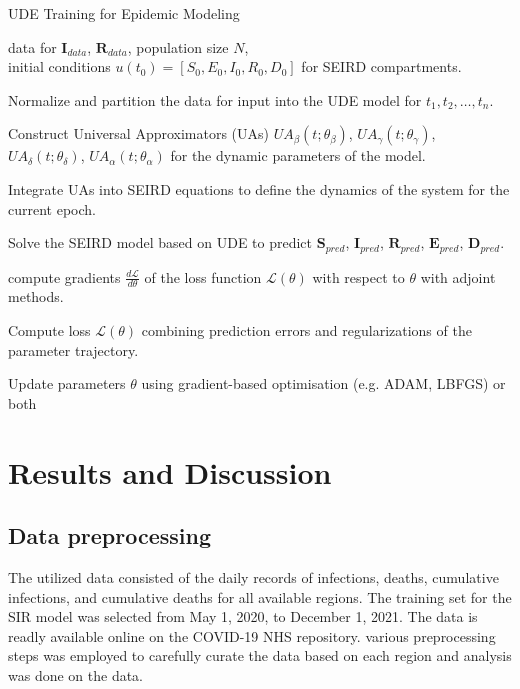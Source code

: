 \documentclass[12pt]{article}
\begin{document}
\begin{algorithm}[h]
    \label{algo:2}
    \caption{UDE Training for Epidemic Modeling}
    \begin{algorithmic}

        \Require data for $\mathbf{I}_{data}$, $\mathbf{R}_{data}$, population size $N$,\\
        initial conditions $u(t_0) = [S_0, E_0, I_0, R_0, D_0]$ for SEIRD compartments.
        
        \State Normalize and partition the data for input into the UDE model for $t_1, t_2, \ldots, t_n$.
        
        \State Construct Universal Approximators (UAs) $UA_{\beta}(t;\theta_{\beta})$, $UA_{\gamma}(t;\theta_{\gamma})$, $UA_{\delta}(t;\theta_{\delta})$, $UA_{\alpha}(t;\theta_{\alpha})$ for the dynamic parameters of the model.


            \State Integrate UAs into SEIRD equations to define the dynamics of the system for the current epoch.

            \State Solve the SEIRD model based on UDE to predict $\mathbf{S}_{pred}$, $\mathbf{I}_{pred}$, $\mathbf{R}_{pred}$, $\mathbf{E}_{pred}$, $\mathbf{D}_{pred}$.

            \State compute gradients $\frac{d\mathcal{L}}{d\theta}$ of the loss function $\mathcal{L}(\theta)$ with respect to $\theta$ with adjoint methods.

            \State Compute loss $\mathcal{L}(\theta)$ combining prediction errors and regularizations of the parameter trajectory.

            \State Update parameters $\theta$ using gradient-based optimisation (e.g. ADAM, LBFGS) or both
        \EndFor
    \end{algorithmic}
\end{algorithm}




\section{Results and Discussion}

\subsection{Data preprocessing}
The utilized data consisted of the daily records of infections, deaths, cumulative infections, and cumulative deaths for all available regions. The training set for the SIR model was selected from May 1, 2020, to December 1, 2021. The data is readly available online on the COVID-19 NHS repository. various preprocessing steps was employed to carefully curate the data based on each region and analysis was done on the data.
\end{document}

